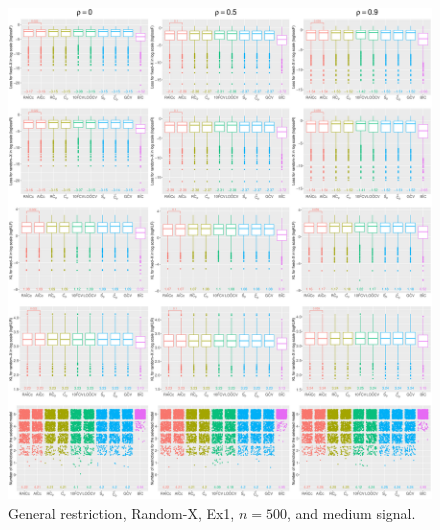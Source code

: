 \clearpage
\begin{figure}[!ht]
\centering
\includegraphics[width=\textwidth]{figures/supplement/randomx/general_restriction/Ex1_n500_msnr.eps}
\caption{General restriction, Random-X, Ex1, $n=500$, and medium signal.}
\end{figure}
\clearpage
